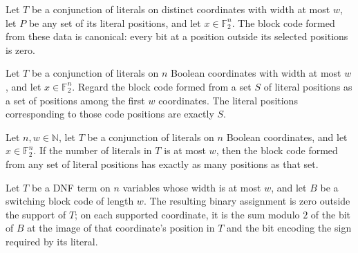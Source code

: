 \begin{theorem}
\label{FABL.DNFTerm.blockCode_canonical}
\leanok
{}
Let $T$ be a conjunction of literals on distinct coordinates with width at most $w$, let
$P$ be any set of its literal positions, and let $x\in\mathbb{F}_2^n$. The block code
formed from these data is canonical: every bit at a position outside its selected
positions is zero.
\end{theorem}

\begin{theorem}
\label{FABL.DNFTerm.blockCode_termPositions}
\leanok
{}
Let $T$ be a conjunction of literals on $n$ Boolean coordinates with width at most $w$,
and let $x\in\mathbb{F}_2^n$. Regard the block code formed from a set $S$ of literal
positions as a set of positions among the first $w$ coordinates. The literal positions
corresponding to those code positions are exactly $S$.
\end{theorem}

\begin{theorem}
\label{FABL.DNFTerm.blockCode_card_positions}
\leanok
{}
Let $n,w\in\mathbb{N}$, let $T$ be a conjunction of literals on $n$ Boolean coordinates,
and let $x\in\mathbb{F}_2^n$. If the number of literals in $T$ is at most $w$, then the
block code formed from any set of literal positions has exactly as many positions as
that set.
\end{theorem}

\begin{definition}
\label{FABL.DNFTerm.assignmentOfBlock}
\leanok
{}
Let $T$ be a DNF term on $n$ variables whose width is at most $w$, and let $B$ be a
switching block code of length $w$. The resulting binary assignment is zero outside the
support of $T$; on each supported coordinate, it is the sum modulo $2$ of the bit of $B$
at the image of that coordinate’s position in $T$ and the bit encoding the sign required
by its literal.
\end{definition}


